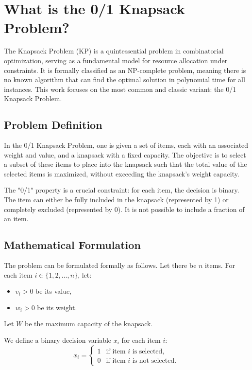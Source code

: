 \section{What is the 0/1 Knapsack Problem?}

The Knapsack Problem (KP) is a quintessential problem in combinatorial optimization, serving as a fundamental model for resource allocation under constraints. It is formally classified as an NP-complete problem, meaning there is no known algorithm that can find the optimal solution in polynomial time for all instances. This work focuses on the most common and classic variant: the 0/1 Knapsack Problem.

\subsection{Problem Definition}

In the 0/1 Knapsack Problem, one is given a set of items, each with an associated weight and value, and a knapsack with a fixed capacity. The objective is to select a subset of these items to place into the knapsack such that the total value of the selected items is maximized, without exceeding the knapsack's weight capacity.

The "0/1" property is a crucial constraint: for each item, the decision is binary. The item can either be fully included in the knapsack (represented by 1) or completely excluded (represented by 0). It is not possible to include a fraction of an item.

\subsection{Mathematical Formulation}

The problem can be formulated formally as follows. Let there be \(n\) items. For each item \(i \in \{1, 2, \dots, n\}\), let:
\begin{itemize}
    \item \(v_i > 0\) be its value,
    \item \(w_i > 0\) be its weight.
\end{itemize}
Let \(W\) be the maximum capacity of the knapsack.

We define a binary decision variable \(x_i\) for each item \(i\):
\[
x_i = 
\begin{cases} 
1 & \text{if item } i \text{ is selected,} \\
0 & \text{if item } i \text{ is not selected.} 
\end{cases}
\]

